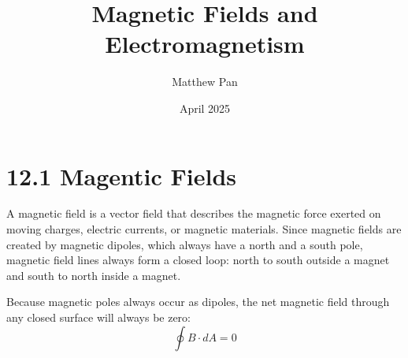 \documentclass[12pt, titlepage]{article}
\title{Magnetic Fields and Electromagnetism}
\author{Matthew Pan}
\date{April 2025}
\begin{document}
\pagestyle{fancy}

\fancyhead{}
\fancyhead[R]{\thepage}

\maketitle

\section*{12.1 Magentic Fields}

A magnetic field is a vector field that describes the magnetic force exerted on moving charges, electric currents, or magnetic materials. Since magnetic fields are created by magnetic dipoles, which always have a north and a south pole, magnetic field lines always form a closed loop: north to south outside a magnet and south to north inside a magnet.

Because magnetic poles always occur as dipoles, the net magnetic field through any closed surface will always be zero:
\begin{equation*}
    \oint B \cdot dA = 0
\end{equation*}
\end{document}
